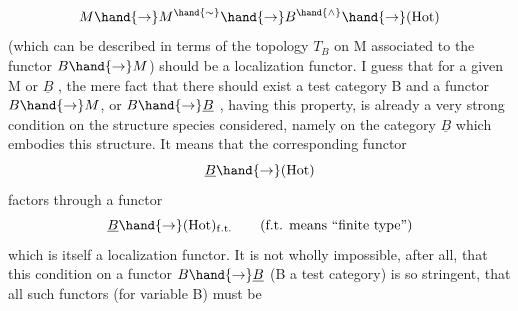 \[ M \hand{\to} M^{\hand{\sim}} \hand{\to} B^{\hand{\wedge}} \hand{\to} (\mathrm{Hot}) \]
(which can be described  in terms of the topology $T_B$ on M associated to
the functor $B \hand{\to} M$\hand{/}) should be a localization functor. I guess that for
a given M or $\underline{B}$ ,\hand{$\wedge$} the mere fact that there should exist a test category
B and a functor $B \hand{\to} M$, or $B \hand{\to} \underline{B}$ , having this property, is already a
very strong condition on the structure species considered, namely on
the category $\underline{B}$ which embodies this structure. It  means that
the corresponding functor
\[ \underline{B} \hand{\to} (\mathrm{Hot}) \]
factors through a functor
\[ \underline{B} \hand{\to} (\mathrm{Hot})_{\mathrm{f.t.}} \qquad \text{(f.t. means ``finite type'')} \]
which is itself a localization functor. It is not wholly impossible,
after all, that this condition on a functor $B \hand{\to} \underline{B}$ (B a test category)
is so stringent, that all such functors (for variable B) must be
